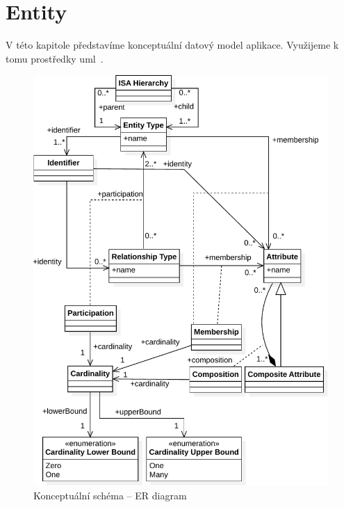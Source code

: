 \section{Entity}\label{section:conceptual-model}

V této kapitole představíme konceptuální datový model aplikace.
Využijeme k tomu prostředky \acrfull{uml}~\cite{omg_uml_2017}.

\begin{figure}[!htb]
  \centering
  \includegraphics[width=\maxwidth{\textwidth}]{../img/diagrams/er-diagram-model.pdf}
  \caption{Konceptuální schéma -- ER diagram}
  \label{fig:class-diagram:er-diagram}
\end{figure}

